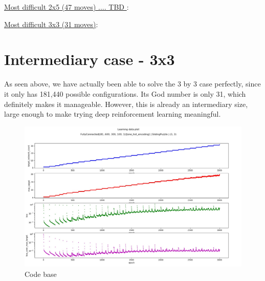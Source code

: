 \underline{Most difficult 2x5 (47 moves) .... TBD }:
\begin{center}
\begin{nine}
\end{nine}
\end{center}
\underline{Most difficult 3x3 (31 moves)}:
\begin{center}
\begin{eight}
\end{eight}
\end{center}



\section{Intermediary case - 3x3}
\label{S33}
As seen above, we have actually been able to solve the 3 by 3 case perfectly, since it only has 181,440 possible configurations. Its God number is only 31, which definitely makes it manageable. However, this is already an intermediary size, large enough to make trying deep reinforcement learning meaningful.



\begin{landscape}
\begin{figure}[H]
\centering
\includegraphics[scale=0.5]{./Figures/33SPDeepReinforcementLearning.jpeg}
\caption[Codebase]{Code base}
\label{fig:Codebase}
\end{figure}
\end{landscape}



